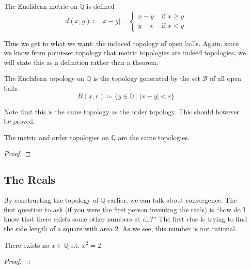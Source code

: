     \begin{definition}
      The Euclidean metric on $\mathbb{Q}$ is defined 
      \begin{equation}
        d(x, y) \coloneqq |x - y| = \begin{cases} x - y & \text{ if } x \geq y \\ y - x & \text{ if } x < y \end{cases}
      \end{equation}
    \end{definition}

    Thus we get to what we want: the induced topology of open balls. 
    Again, since we know from point-set topology that metric topologies are indeed topologies, we will state this as a definition rather than a theorem.  

    \begin{definition}
      The Euclidean topology on $\mathbb{Q}$ is the topology generated by the set $\mathscr{B}$ of all open balls
      \begin{equation}
        B(x, r) \coloneqq \{ y \in \mathbb{Q} \mid |x - y| < r \}
      \end{equation} 
    \end{definition}

    Note that this is the same topology as the order topology. This should however be proved. 

    \begin{theorem}
      The metric and order topologies on $\mathbb{Q}$ are the same topologies. 
    \end{theorem}
    \begin{proof}
      
    \end{proof}

\subsection{The Reals}

    By constructing the topology of $\mathbb{Q}$ earlier, we can talk about convergence. The first question to ask (if you were the first person inventing the reals) is ``how do I know that there exists some other numbers at all?'' The first clue is trying to find the side length of a square with area $2$. As we see, this number is not rational. 

    \begin{theorem}
      There exists no $x \in \mathbb{Q}$ s.t. $x^2 = 2$. 
    \end{theorem}
    \begin{proof}
      
    \end{proof} 

